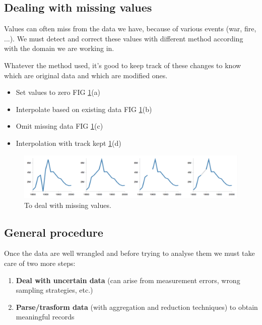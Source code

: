 \documentclass[a4paper,11pt,twoside]{article}
\begin{document}
\subsection{Dealing with missing values}

Values can often miss from the data we have, because of various events (war, fire, ...). We must detect and correct these values with different method according with the domain we are working in.

Whatever the method used, it's good to keep track of these changes to know which are original data and which are modified ones.

\begin{itemize}
  \item Set values to zero FIG \ref{miss_val}(a)
  \item Interpolate based on existing data FIG \ref{miss_val}(b)
  \item Omit missing data FIG \ref{miss_val}(c)
  \item Interpolation with track kept \ref{miss_val}(d)
\end{itemize}

\begin{figure}[H]%
 \centering
 \includegraphics[width=15cm]{./pic/missing_values}
 \caption{\label{miss_val}To deal with missing values.}
\end{figure}

\subsection{General procedure}

Once the data are well wrangled and before trying to analyse them we must take care of two more steps:

\begin{enumerate}
  \item \textbf{Deal with uncertain data} (can arise from measurement errors, wrong sampling strategies, etc.)
  \item \textbf{Parse/trasform data} (with aggregation and reduction techniques) to obtain meaningful records
\end{enumerate}
 
\end{document}
